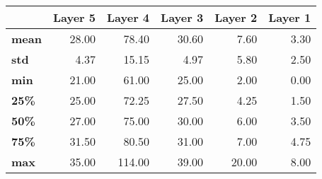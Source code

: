 \begin{tabular}{lrrrrr}
\toprule
{} &  Layer 5 &  Layer 4 &  Layer 3 &  Layer 2 &  Layer 1 \\
\midrule
\textbf{mean} &    28.00 &    78.40 &    30.60 &     7.60 &     3.30 \\
\textbf{std } &     4.37 &    15.15 &     4.97 &     5.80 &     2.50 \\
\textbf{min } &    21.00 &    61.00 &    25.00 &     2.00 &     0.00 \\
\textbf{25\% } &    25.00 &    72.25 &    27.50 &     4.25 &     1.50 \\
\textbf{50\% } &    27.00 &    75.00 &    30.00 &     6.00 &     3.50 \\
\textbf{75\% } &    31.50 &    80.50 &    31.00 &     7.00 &     4.75 \\
\textbf{max } &    35.00 &   114.00 &    39.00 &    20.00 &     8.00 \\
\bottomrule
\end{tabular}
